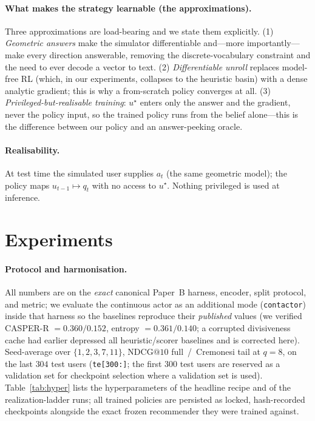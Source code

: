 \documentclass[11pt]{article}
\newcommand{\ustar}{u^{\star}}
\begin{document}
\paragraph{What makes the strategy learnable (the approximations).} Three approximations are load-bearing and we state
them explicitly. (1) \emph{Geometric answers} make the simulator differentiable and---more importantly---make every
direction answerable, removing the discrete-vocabulary constraint and the need to ever decode a vector to text. (2)
\emph{Differentiable unroll} replaces model-free RL (which, in our experiments, collapses to the heuristic basin) with a
dense analytic gradient; this is why a from-scratch policy converges at all. (3) \emph{Privileged-but-realisable
training}: $\ustar$ enters only the answer and the gradient, never the policy input, so the trained policy runs from the
belief alone---this is the difference between our policy and an answer-peeking oracle.

\paragraph{Realisability.} At test time the simulated user supplies $a_t$ (the same geometric model); the policy maps
$u_{t-1}\mapsto q_t$ with no access to $\ustar$. Nothing privileged is used at inference.

\section{Experiments}\label{sec:exp}
\paragraph{Protocol and harmonisation.} All numbers are on the \emph{exact} canonical Paper~B harness, encoder, split
protocol, and metric; we evaluate the continuous actor as an additional mode (\texttt{contactor}) inside that harness so
the baselines reproduce their \emph{published} values (we verified CASPER-R $=0.360/0.152$, entropy $=0.361/0.140$;
a corrupted divisiveness cache had earlier depressed all heuristic/scorer baselines and is corrected here). Seed-average
over $\{1,2,3,7,11\}$, $\mathrm{NDCG@10}$ full~/~Cremonesi tail at $q{=}8$, on the last $304$ test users
(\texttt{te[300:]}; the first $300$ test users are reserved as a validation set for checkpoint selection where a
validation set is used). Table~\ref{tab:hyper} lists the hyperparameters of the headline recipe and of the
realization-ladder runs; all trained policies are persisted as locked, hash-recorded checkpoints alongside the exact
frozen recommender they were trained against.
\end{document}
